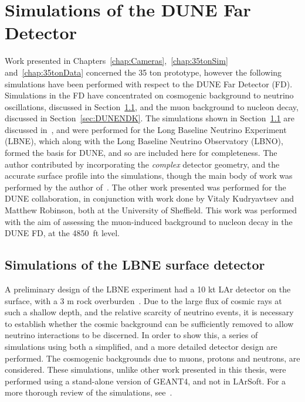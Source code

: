 

\chapter{Simulations of the DUNE Far Detector} \label{chap:FDSims} %
\graphicspath{{FarDetectorSimulations/Figs/Raster/}{FarDetectorSimulations/Figs/PDF/}{FarDetectorSimulations/Figs/Vector/}}

Work presented in Chapters~\ref{chap:Cameras},~\ref{chap:35tonSim} and~\ref{chap:35tonData} concerned the 35 ton prototype, however the following simulations have been performed with respect to the DUNE Far Detector (FD). Simulations in the FD have concentrated on cosmogenic background to neutrino oscillations, discussed in Section~\ref{sec:LBNESurf}, and the muon background to nucleon decay, discussed in Section~\ref{sec:DUNENDK}. The simulations shown in Section~\ref{sec:LBNESurf} are discussed in~\citep{MartinsThesis}, and were performed for the Long Baseline Neutrino Experiment (LBNE), which along with the Long Baseline Neutrino Observatory (LBNO), formed the basis for DUNE, and so are included here for completeness. The author contributed by incorporating the \emph{complex} detector geometry, and the accurate surface profile into the simulations, though the main body of work was performed by the author of~\citep{MartinsThesis}. The other work presented was performed for the DUNE collaboration, in conjunction with work done by Vitaly Kudryavtsev and Matthew Robinson, both at the University of Sheffield. This work was performed with the aim of assessing the muon-induced background to nucleon decay in the DUNE FD, at the 4850~ft level. \\

\section{Simulations of the LBNE surface detector} \label{sec:LBNESurf} %
A preliminary design of the LBNE experiment had a 10 kt LAr detector on the surface, with a 3 m rock overburden~\citep{LBNE6493}. Due to the large flux of cosmic rays at such a shallow depth, and the relative scarcity of neutrino events, it is necessary to establish whether the cosmic background can be sufficiently removed to allow neutrino interactions to be discerned. In order to show this, a series of simulations using both a simplified, and a more detailed detector design are performed. The cosmogenic backgrounds due to muons, protons and neutrons, are considered. These simulations, unlike other work presented in this thesis, were performed using a stand-alone version of GEANT4, and not in LArSoft. For a more thorough review of the simulations, see~\citep{MartinsThesis}. \\

